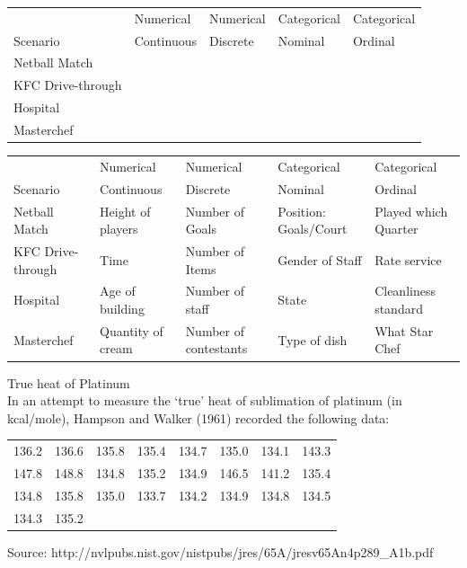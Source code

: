 \documentclass[bigtut]{tutorial}\usepackage[]{graphicx}\usepackage[]{color}
\begin{document}
\begin{tutorial}
\begin{questions}
\begin{tabular}{|l|l|l|l|l|} \hline
& Numerical & Numerical & Categorical & Categorical \\
Scenario & Continuous \hspace{1cm} &  Discrete \hspace{1cm} &  Nominal \hspace{1cm} &  Ordinal \hspace{1cm} \\ \hline
Netball Match & & & & \\ \hline
KFC Drive-through & & & & \\ \hline
Hospital & & & & \\ \hline
Masterchef & & & & \\ \hline
\end{tabular}

\vspace{.5cm}
\begin{solution}
{\tiny 
\begin{tabular}{|l|l|l|l|l|} \hline
& Numerical & Numerical & Categorical & Categorical \\
Scenario & Continuous \hspace{1cm} &  Discrete \hspace{1cm} &  Nominal \hspace{1cm} &  Ordinal \hspace{1cm} \\ \hline
Netball Match & Height of players & Number of Goals & Position: Goals/Court & Played which Quarter \\ \hline
KFC Drive-through & Time & Number of Items & Gender of Staff & Rate service \\ \hline
Hospital & Age of building & Number of staff & State & Cleanliness standard \\ \hline
Masterchef & Quantity of cream & Number of contestants & Type of dish & What Star Chef  \\ \hline
\end{tabular}
}
\end{solution}



\question True heat of Platinum \\

In an attempt to measure the `true' heat of sublimation of platinum (in kcal/mole),
Hampson and Walker (1961) recorded the following data:

\begin{center}
\begin{tabular}{llllllll}
136.2&136.6&135.8&135.4&134.7&135.0&134.1&143.3 \\
147.8&148.8&134.8&135.2&134.9&146.5&141.2&135.4 \\
134.8&135.8&135.0&133.7&134.2&134.9& 134.8 & 134.5 \\
134.3 & 135.2 &&&&&&
\end{tabular}
\end{center}
{\tiny Source: http://nvlpubs.nist.gov/nistpubs/jres/65A/jresv65An4p289\_A1b.pdf} 


\end{questions}
\end{tutorial}
\end{document}
